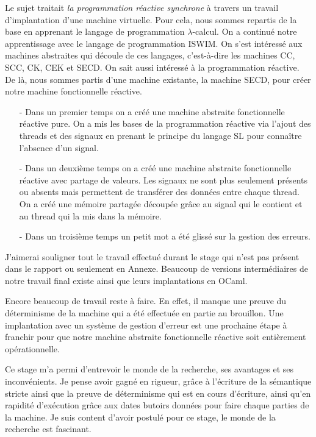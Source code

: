 \documentclass[10pt,a4paper]{report}
\begin{document}
	Le sujet traitait \textit{la programmation réactive synchrone} à travers un travail d'implantation d'une machine virtuelle. Pour cela, nous sommes repartis de la base en apprenant le langage de programmation $\lambda$-calcul. On a continué notre apprentissage avec le langage de programmation ISWIM. On s'est intéressé aux machines abstraites qui découle de ces langages, c'est-à-dire les machines CC, SCC, CK, CEK et SECD. On sait aussi intéressé à la programmation réactive. De là, nous sommes partis d'une machine existante, la machine SECD, pour créer notre machine fonctionnelle réactive.
	\begin{itemize}
		\item[-] Dans un premier temps on a créé une machine abstraite fonctionnelle réactive pure. On a mis les bases de la programmation réactive via l'ajout des threads et des signaux en prenant le principe du langage SL pour connaître l'absence d'un signal. 
		\item[-]Dans un deuxième temps on a créé une machine abstraite fonctionnelle réactive avec partage de valeurs. Les signaux ne sont plus seulement présents ou absents mais permettent de transférer des données entre chaque thread. On a créé une mémoire partagée découpée grâce au signal qui le contient et au thread qui la mis dans la mémoire.
		\item[-] Dans un troisième temps un petit mot a été glissé sur la gestion des erreurs. 
	\end{itemize}
	\medbreak
	
	J'aimerai souligner tout le travail effectué durant le stage qui n'est pas présent dans le rapport ou seulement en Annexe. Beaucoup de versions intermédiaires de notre travail final existe ainsi que leurs implantations en OCaml.
	\medbreak
	
	Encore beaucoup de travail reste à faire. En effet, il manque une preuve du déterminisme de la machine qui a été effectuée en partie au brouillon. Une implantation avec un système de gestion d'erreur est une prochaine étape à franchir pour que notre machine abstraite fonctionnelle réactive soit entièrement opérationnelle.
	\medbreak
	
	Ce stage m'a permi d'entrevoir le monde de la recherche, ses avantages et ses inconvénients. Je pense avoir gagné en rigueur, grâce à l'écriture de la sémantique stricte ainsi que la preuve de déterminisme qui est en cours d'écriture, ainsi qu'en rapidité d'exécution grâce aux dates butoirs données pour faire chaque parties de la machine. Je suis content d'avoir postulé pour ce stage, le monde de la recherche est fascinant.
	
\end{document}
